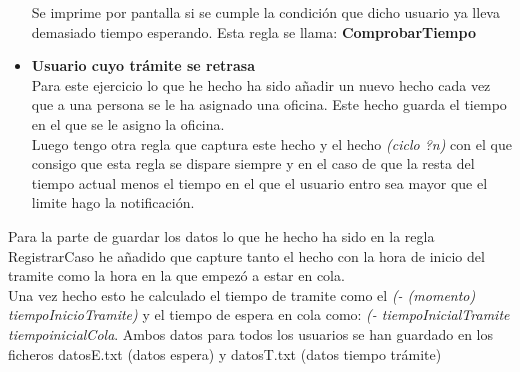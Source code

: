 \documentclass[10pt,spanish]{article}
\begin{document}
\begin{itemize}
		Se imprime por pantalla si se cumple la condición que dicho usuario ya lleva demasiado tiempo esperando. Esta regla se llama: \textbf{ComprobarTiempo}
	\item \textbf{Usuario cuyo trámite se retrasa}\\
		Para este ejercicio lo que he hecho ha sido añadir un nuevo hecho cada vez que a una persona se le ha asignado una oficina. Este hecho guarda el tiempo en el que se le asigno la oficina.\\
	  Luego tengo otra regla que captura este hecho y el hecho \textit{(ciclo ?n)} con el que consigo que esta regla se dispare siempre y en el caso de que la resta del tiempo actual menos el tiempo en el que el usuario entro sea mayor que el limite hago la notificación.
	\end{itemize}
	Para la parte de guardar los datos lo que he hecho ha sido en la regla RegistrarCaso he añadido que capture tanto el hecho con la hora de inicio del tramite como la hora en la que empezó a estar en cola. \\
	Una vez hecho esto he calculado el tiempo de tramite como el \textit{(- (momento) tiempoInicioTramite)} y el tiempo de espera en cola como: \textit{(- tiempoInicialTramite tiempoinicialCola}.
	Ambos datos para todos los usuarios se han guardado en los ficheros datosE.txt (datos espera) y datosT.txt (datos tiempo trámite)
\end{document}
